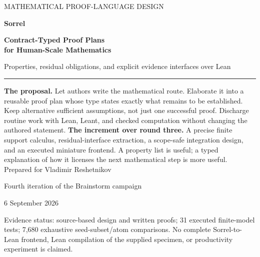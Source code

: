 \documentclass[11pt,a4paper]{article}
\numberwithin{equation}{section}
\theoremstyle{definition}\newtheorem{definition}[theorem]{Definition}
\theoremstyle{remark}\newtheorem{remark}[theorem]{Remark}
\begin{document}
\hypersetup{pageanchor=false}
\begin{titlepage}
\vspace*{12mm}
{\sffamily\large\color{accent}MATHEMATICAL PROOF-LANGUAGE DESIGN\par}
\vspace{19mm}
{\sffamily\bfseries\color{ink}\fontsize{44}{48}\selectfont Sorrel\par}
\vspace{6mm}
{\sffamily\bfseries\color{ink}\fontsize{24}{29}\selectfont Contract-Typed Proof Plans\\for Human-Scale Mathematics\par}
\vspace{9mm}
{\sffamily\Large Properties, residual obligations, and explicit evidence interfaces over Lean\par}
\vspace{13mm}\rule{\textwidth}{0.7pt}\vspace{4mm}
\textbf{The proposal.} Let authors write the mathematical route. Elaborate it
into a reusable proof plan whose type states exactly what remains to be
established. Keep alternative sufficient assumptions, not just one successful
proof. Discharge routine work with Lean, Leant, and checked computation without
changing the authored statement.
\vspace{7mm}
\textbf{The increment over round three.} A precise finite support calculus,
residual-interface extraction, a scope-safe integration design, and an executed
miniature frontend. A property list is useful; a typed explanation of how it
licenses the next mathematical step is more useful.
\vfill
Prepared for Vladimir Reshetnikov\par
Fourth iteration of the Brainstorm campaign\par
6 September 2026\par
\vspace{5mm}
{\small\color{muted}Evidence status: source-based design and written proofs;
31 executed finite-model tests; 7,680 exhaustive seed-subset/atom comparisons.
No complete Sorrel-to-Lean frontend, Lean compilation of the supplied specimen,
or productivity experiment is claimed.}
\end{titlepage}
\hypersetup{pageanchor=true}
\end{document}
